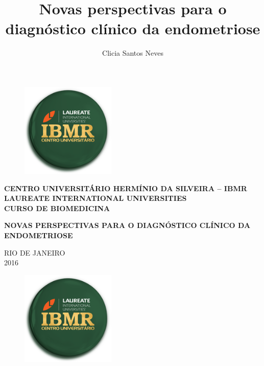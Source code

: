 \documentclass[12pt]{article} %
\title{Novas perspectivas para o diagnóstico clínico da endometriose}
\author{Clicia Santos Neves}
\begin{document}
\begin{figure}[h!]
\centering
\includegraphics[width=4.5cm]{ibmr.png}
\end{figure}
 \selectfont

\begin{center}
\textbf{CENTRO UNIVERSITÁRIO HERMÍNIO DA SILVEIRA – IBMR \\
LAUREATE INTERNATIONAL UNIVERSITIES \\
CURSO DE BIOMEDICINA}
\end{center}

\vspace{2.5cm}

\begin{center}
\MakeUppercase{\theauthor}
\end{center}

\vspace{3.5cm}

\begin{center}
\MakeUppercase{\textbf{Novas perspectivas para o diagnóstico clínico da endometriose}}
\end{center}

\vspace{5.5cm}

\begin{center}
\MakeUppercase{Rio de Janeiro}\\
2016
\end{center}

\newpage


\begin{figure}[h!]
\centering
\includegraphics[width=4.5cm]{ibmr.png}
\end{figure}
\end{document}
